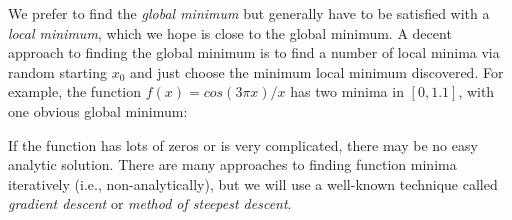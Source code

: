 \begin{fullwidth}
We prefer to find the {\em global minimum} but generally have to be satisfied with a {\em local minimum}, which we hope is close to the global minimum. A decent approach to finding the global minimum is to find a number of local minima via random starting $x_0$ and just choose the minimum local minimum discovered. For example, the function $f(x) = cos(3\pi x) / x$ has two minima in $[0,1.1]$, with one obvious global minimum:


If the function has lots of zeros or is very complicated, there may be no easy analytic solution.
There are many approaches to finding function minima iteratively (i.e., non-analytically), but we will use a well-known technique called {\em gradient descent} or {\em method of steepest descent}.  


\end{fullwidth}
